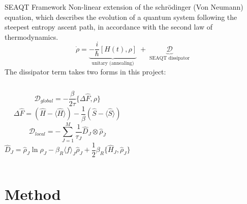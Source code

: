 \documentclass[aspectratio=169,11pt]{beamer}
\begin{document}
\begin{frame}{SEAQT Framework}
Non-linear extension of the schr\"odinger (Von Neumann) equation, which describes the evolution of a quantum system following the steepest entropy ascent path, in accordance with the second law of thermodynamics. 
  \[
    \dot\rho = \underbrace{-\frac{i}{\hbar}[H(t),\rho]}_{\text{unitary (annealing)}} \;+\; \underbrace{\mathcal{D}}_{\text{SEAQT dissipator}}
  \]
 The dissipator term takes two forms in this project:
 \begin{columns}
     \[\mathcal{D}_{global}= -\frac{\beta}{2\tau}\{\Delta \hat F,\rho\}\] \[ 
    \Delta \hat F = (\hat H - \langle  \hat H \rangle ) - \frac{1}{\beta}(\hat S - \langle \hat S\rangle) \] 
    \[
    \mathcal{D}_{local} = -\sum_{J = 1}^{M} \frac{1}{\tau_J}\hat{D}_J\otimes\hat{\rho}_{\bar{J}}
  \]
  \[
    \hat{D}_J = \hat{\rho}_J \ln \hat{\rho}_J - \beta_R \langle f \rangle_J \hat{\rho}_J +\frac{1}{2} \beta_R \{ \hat{H}_J , \hat{\rho}_J\}
  \]
 \end{columns}
\end{frame}

\section{Method}
\end{document}
